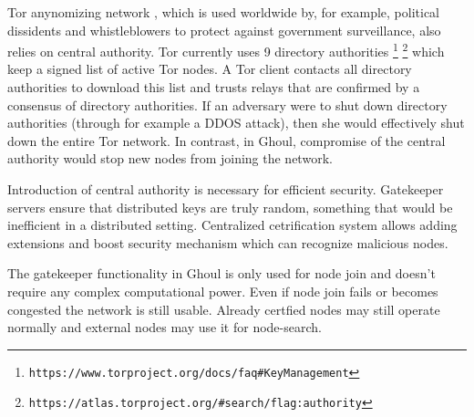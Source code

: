   Tor anynomizing network \cite{syv04}, which is used worldwide by, for example,
  political dissidents and whistleblowers to protect against government
  surveillance, also relies on central authority. Tor currently uses 9 directory
  authorities
  \footnote{\texttt{https://www.torproject.org/docs/faq\#KeyManagement}}
    \footnote{\texttt{https://atlas.torproject.org/\#search/flag:authority}}
  which keep a signed list of active Tor nodes.
  A Tor client contacts all directory authorities to download this list and
  trusts relays that are confirmed by a consensus of directory authorities.
  If an adversary were to shut down directory authorities (through for example a
  DDOS attack), then she would effectively shut down the entire Tor network.
  In contrast, in Ghoul, compromise of the central authority would stop new
  nodes from joining the network.

  Introduction of central authority is necessary for efficient security.
  Gatekeeper servers ensure that distributed keys are truly random, something
  that would be inefficient in a distributed setting. Centralized cetrification
  system allows adding extensions and boost security mechanism which can
  recognize malicious nodes.

  The gatekeeper functionality in Ghoul is only used for node join and doesn't
  require any complex computational power. Even if node join fails or becomes
  congested the network is still usable. Already certfied nodes may still
  operate normally and external nodes may use it for node-search.
